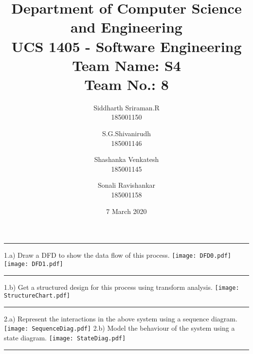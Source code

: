 \documentclass[12pt,letterpaper]{article}
\title{\textbf{Department of Computer Science and Engineering\\
				\large \textbf{UCS 1405 - Software Engineering}\\
				\large Team Name: S4\\
				\large Team No.: 8}}
\author{Siddharth Sriraman.R\\185001150 \and S.G.Shivanirudh\\185001146 \and Shashanka Venkatesh\\185001145 \and Sonali Ravishankar\\185001158}
\date{7 March 2020}
\begin{document}
\begin{titlepage}
\maketitle
\thispagestyle{empty}
\end{titlepage}
\subsection*{}
\hrule
\bigskip
1.a) Draw a DFD to show the data flow of this process.\break
\bigskip
\texttt{[image: DFD0.pdf]}
\bigskip
\bigskip
\texttt{[image: DFD1.pdf]}
\hrule
\bigskip
1.b) Get a structured design for this process using transform analysis.\break
\texttt{[image: StructureChart.pdf]}
\hrule
2.a) Represent the interactions in the above system using a sequence
diagram.\break
\bigskip
\texttt{[image: SequenceDiag.pdf]}
\bigskip
\newpage
2.b) Model the behaviour of the system using a state diagram.\break
\bigskip
\texttt{[image: StateDiag.pdf]}
\hrule
\end{document}
